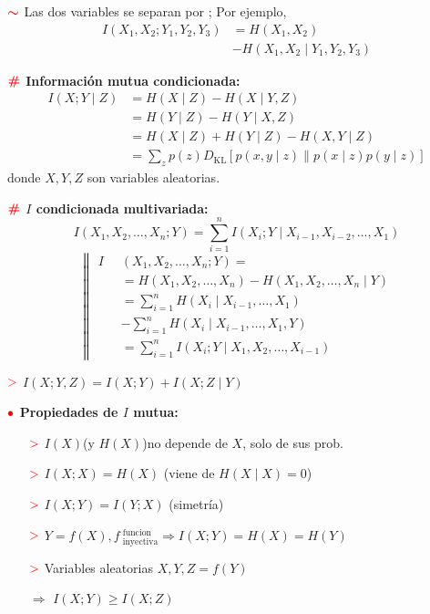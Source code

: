 \documentclass[%
 reprint,
 amsmath,amssymb,
 aps,
]{revtex4-1}
\begin{document}
\textbf{$\textcolor{red}{\color{red}{\boldsymbol{\sim}}}$} Las dos variables se separan por ; Por ejemplo, 
$$
\begin{aligned}
  I\left(X_{1}, X_{2} ; Y_{1}, Y_{2}, Y_{3}\right) &= H\left(X_{1}, X_{2}\right) \\
  & - H\left(X_{1}, X_{2} \mid Y_{1}, Y_{2}, Y_{3}\right)
\end{aligned}
$$

\textbf{$\color{red}{\textbf{\#}}$ Información mutua condicionada:}
$$
\begin{aligned}
I(X ; Y \mid Z) &=H(X \mid Z)-H(X \mid Y, Z) \\
&=H(Y \mid Z)-H(Y \mid X, Z) \\
&=H(X \mid Z)+H(Y \mid Z)-H(X, Y \mid Z) \\
&=\sum_{z} p(z) D_{\mathrm{KL}}[p(x, y \mid z) \| p(x \mid z) p(y \mid z)]
\end{aligned}
$$
donde $X, Y, Z$ son variables aleatorias.

\textbf{$\color{red}{\textbf{\#}}$ $I$ condicionada multivariada:} 
$$
I\left(X_{1}, X_{2}, \ldots, X_{n} ; Y\right)=\sum_{i=1}^{n} I\left(X_{i} ; Y \mid X_{i-1}, X_{i-2}, \ldots, X_{1}\right)
$$
$$
\left\|
\begin{aligned}
I & \left(X_{1}, X_{2}, \ldots, X_{n} ; Y\right) = \\
\quad &=H\left(X_{1}, X_{2}, \ldots, X_{n}\right)-H\left(X_{1}, X_{2}, \ldots, X_{n} \mid Y\right) \\
\quad &=\sum_{i=1}^{n} H\left(X_{i} \mid X_{i-1}, \ldots, X_{1}\right)\\
&-\sum_{i=1}^{n} H\left(X_{i} \mid X_{i-1}, \ldots, X_{1}, Y\right) \\
\quad &=\sum_{i=1}^{n} I\left(X_{i} ; Y \mid X_{1}, X_{2}, \ldots, X_{i-1}\right)
\end{aligned}
\right.
$$

\textbf{$\textcolor{red}{\mathbf{>}}$} $ I(X ; Y, Z)=I(X ; Y)+I(X ; Z \mid Y) $

\textbf{$\color{red}{\bullet}$ Propiedades de $I$ mutua: }

\begin{enumerate}
  \item[$\textcolor{red}{\mathbf{>}}$] $I(X)$(y $H(X)$)no depende de $X$, solo de sus prob.
  \item[$\textcolor{red}{\mathbf{>}}$] $ I(X ; X)=H(X) $ (viene de $H(X \mid X)=0$)
  \item[$\textcolor{red}{\mathbf{>}}$] $ I(X ; Y)=I(Y ; X) $ (simetría)
  \item[$\textcolor{red}{\mathbf{>}}$]   
  $Y=f(X), f \ ^\text{funcion}_\text{inyectiva} \Rightarrow I(X ; Y)=H(X)=H(Y)$
  \item[$\textcolor{red}{\mathbf{>}}$] Variables aleatorias $X, Y, Z=f(Y)$ 
  
  $\Rightarrow$
  $I(X ; Y) \geq I(X ; Z)$
\end{enumerate}
\end{document}
